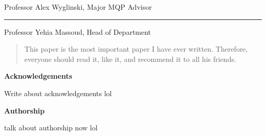 \documentclass[12pt]{report}
\begin{document}
	Professor Alex Wyglinski, Major MQP Advisor
	
	\vspace{0.5in}
	\rule{3in}{0.8pt}
	
	Professor Yehia Massoud, Head of Department	
	
	
	\newpage
	
	\doublespacing
	
	\begin{abstract}
		This paper is the most important paper I have ever written. Therefore,
		everyone should read it, like it, and recommend it to all his friends.
	\end{abstract}
	
	
	
	\begin{center}
		\textbf{Acknowledgements}
	\end{center}
	Write about acknowledgements lol

	\begin{center}
		\textbf{Authorship}
	\end{center}
	talk about authorship now lol

	\clearpage
	
	\tableofcontents
	
	\listoffigures
	
	\listoftables
	
	
	\clearpage
	\setcounter{page}{1}
	
	
	
	
	
	
	
	
	
	
	
	\singlespacing
	\nocite{*}
	
	
	
\end{document}
